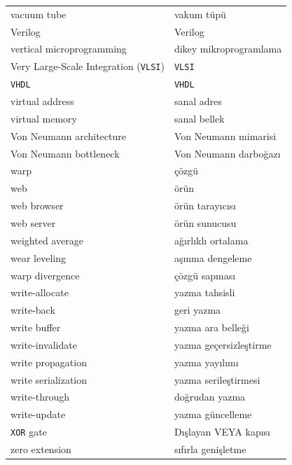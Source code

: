 {\begin{longtable}{@{}p{7.6cm}p{7.6cm}@{}}
vacuum tube & vakum tüpü \\
Verilog & Verilog \\
vertical microprogramming & dikey mikroprogramlama \\
Very Large-Scale Integration (\texttt{VLSI}) & \texttt{VLSI} \\
\texttt{VHDL} & \texttt{VHDL} \\
virtual address & sanal adres \\
virtual memory & sanal bellek \\
Von Neumann architecture & Von Neumann mimarisi \\
Von Neumann bottleneck & Von Neumann darboğazı \\

warp & çözgü \\
web & örün \\
web browser & örün tarayıcısı \\
web server & örün sunucusu \\
weighted average & ağırlıklı ortalama \\
wear leveling & aşınma dengeleme \\
warp divergence & çözgü sapması \\
write-allocate & yazma tahsisli \\
write-back & geri yazma \\
write buffer & yazma ara belleği \\
write-invalidate & yazma geçersizleştirme \\
write propagation & yazma yayılımı \\
write serialization & yazma serileştirmesi \\
write-through & doğrudan yazma \\
write-update & yazma güncelleme \\

\texttt{XOR} gate & Dışlayan VEYA kapısı \\

zero extension & sıfırla genişletme \\

\end{longtable}
}

